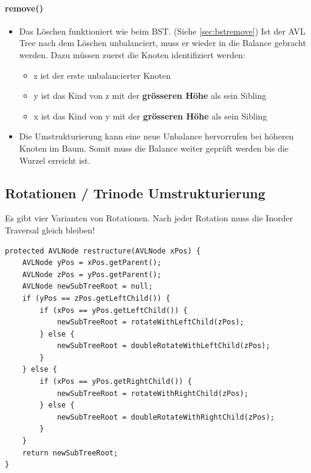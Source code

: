 \paragraph{remove()} 
\begin{itemize}
	\item Das Löschen funktioniert wie beim BST. (Siehe \ref{sec:bstremove}) Ist der AVL Tree nach dem Löschen unbalanciert, muss er wieder in die Balance gebracht werden. Dazu müssen zuerst die Knoten identifiziert werden:
	\begin{itemize}
		\item z ist der erste unbalancierter Knoten
		\item y ist das Kind von z mit der \textbf{grösseren Höhe} als sein Sibling
		\item x ist das Kind von y mit der \textbf{grösseren Höhe} als sein Sibling
	\end{itemize} 
	\item Die Umstrukturierung kann eine neue Unbalance hervorrufen bei höheren Knoten im Baum. Somit muss die Balance weiter geprüft werden bis die Wurzel erreicht ist.
\end{itemize}

\clearpage

\subsection{Rotationen / Trinode Umstrukturierung}
Es gibt vier Varianten von Rotationen. Nach jeder Rotation muss die Inorder Traversal gleich bleiben!
\begin{lstlisting}[caption=AVL Tree Rotations]
protected AVLNode restructure(AVLNode xPos) {
	AVLNode yPos = xPos.getParent();
	AVLNode zPos = yPos.getParent();
	AVLNode newSubTreeRoot = null;
	if (yPos == zPos.getLeftChild()) {
		if (xPos == yPos.getLeftChild()) {
			newSubTreeRoot = rotateWithLeftChild(zPos);
		} else {
			newSubTreeRoot = doubleRotateWithLeftChild(zPos);
		}
	} else {
		if (xPos == yPos.getRightChild()) {
			newSubTreeRoot = rotateWithRightChild(zPos);
		} else {
			newSubTreeRoot = doubleRotateWithRightChild(zPos);
		}
	}
	return newSubTreeRoot;
}
\end{lstlisting}

